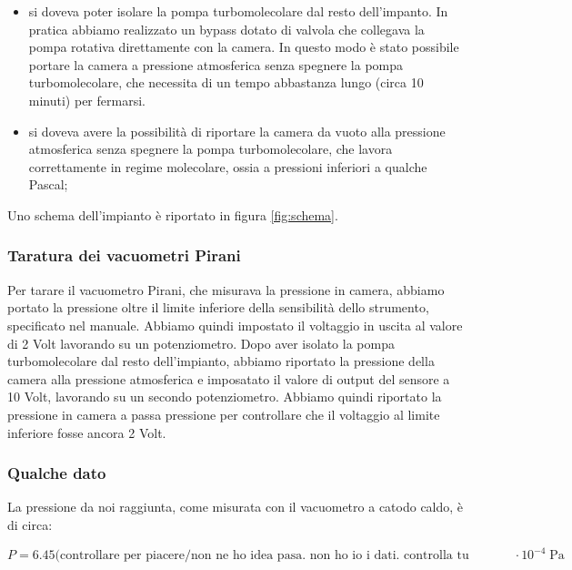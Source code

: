 \begin{itemize}
	\item{si doveva poter isolare la pompa turbomolecolare dal resto dell'impanto. In pratica abbiamo realizzato un bypass
    dotato di valvola che collegava la pompa rotativa direttamente con la camera. In questo modo è stato possibile portare la camera a pressione atmosferica senza spegnere la pompa turbomolecolare, che necessita di un tempo abbastanza lungo (circa 10 minuti) per fermarsi.} %
	\item{si doveva avere la possibilità di riportare la camera da vuoto alla pressione atmosferica senza spegnere
    la pompa turbomolecolare, che lavora correttamente in regime molecolare, ossia a pressioni inferiori a qualche Pascal;}
\end{itemize}

Uno schema dell'impianto è riportato in figura \ref{fig:schema}.

\subsubsection{Taratura dei vacuometri Pirani}

Per tarare il vacuometro Pirani, che misurava la pressione in camera,
abbiamo portato la pressione oltre il limite inferiore
della sensibilità dello strumento, specificato nel manuale. Abbiamo quindi impostato il
voltaggio in uscita al valore di 2 Volt lavorando su un potenziometro. Dopo aver isolato la pompa turbomolecolare dal resto
dell'impianto, abbiamo riportato la pressione della camera alla pressione atmosferica e
imposatato il valore di output del sensore a 10 Volt, lavorando su un secondo potenziometro. Abbiamo quindi riportato la pressione in
camera a passa pressione per controllare che il voltaggio al limite inferiore fosse ancora 2 Volt.

\subsubsection{Qualche dato}

La pressione da noi raggiunta, come misurata con il vacuometro a catodo caldo, è di circa:

\begin{equation}
    P = 6.45 \text{(controllare per piacere/non ne ho idea pasa. non ho io i dati. controlla tu mayeni)} \cdot 10^{-4} \; \si{\pascal}
\end{equation}

